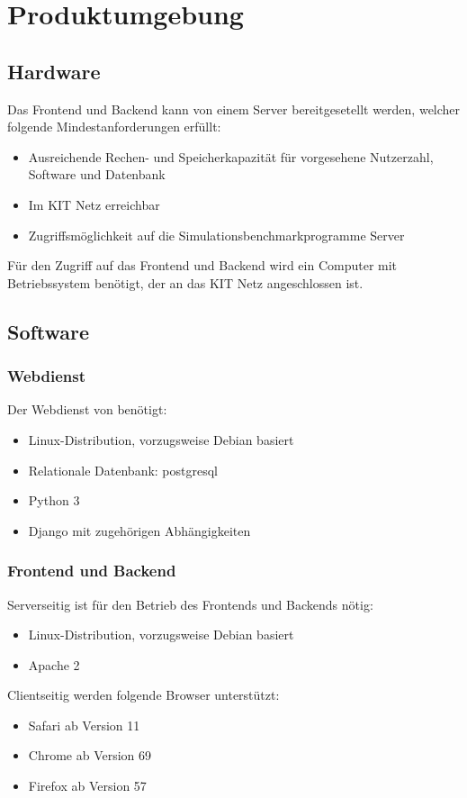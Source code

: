 \section{Produktumgebung}
\subsection{Hardware}
Das \gls{Frontend} und \gls{Backend} kann von einem \gls{Server} bereitgesetellt werden, welcher folgende Mindestanforderungen erfüllt:
\begin{itemize}
    \item Ausreichende Rechen- und Speicherkapazität für vorgesehene \gls{Nutzer}zahl, Software und \gls{Datenbank}
    \item Im KIT Netz erreichbar
    \item Zugriffsmöglichkeit auf die Simulationsbenchmarkprogramme Server
\end{itemize}
      
Für den Zugriff auf das Frontend und Backend wird ein Computer mit Betriebssystem benötigt, der an das KIT Netz angeschlossen ist.
\subsection{Software}
\subsubsection{Webdienst}
Der Webdienst von \name benötigt:
\begin{itemize}
    \item Linux-Distribution, vorzugsweise Debian basiert
    \item Relationale Datenbank: postgresql
    \item Python 3
    \item Django mit zugehörigen Abhängigkeiten
\end{itemize}

\subsubsection{Frontend und Backend}
Serverseitig ist für den Betrieb des Frontends und Backends nötig:
\begin{itemize}
    \item Linux-Distribution, vorzugsweise Debian basiert
    \item Apache 2
\end{itemize}
\gls{Client}seitig werden folgende Browser unterstützt:
\begin{itemize}
    \item Safari ab Version 11
    \item Chrome ab Version 69
    \item Firefox ab Version 57
\end{itemize}

